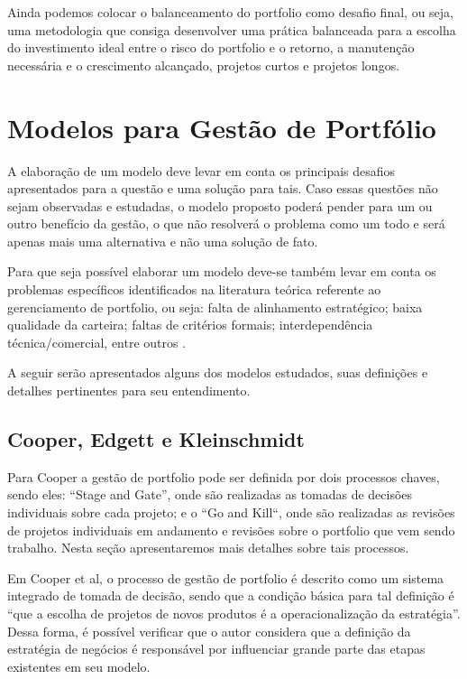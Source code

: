 \documentclass[12pt,a4paper,ruledheader,tocpage=prefix,floatnumber=continuous,pagestart=folhaderosto,font=times]{abnt}
\begin{document}
Ainda podemos colocar o balanceamento do portfolio como desafio final, ou seja, uma metodologia que consiga 
desenvolver uma prática balanceada para a escolha do investimento ideal entre o risco do portfolio e o retorno, a manutenção necessária e o crescimento 
alcançado, projetos curtos e projetos longos.\cite{cooper}

\chapter{Modelos para Gestão de Portfólio} 
A elaboração de um modelo deve levar em conta os principais desafios apresentados para a questão e uma solução para tais. Caso essas questões não sejam 
observadas e estudadas, o modelo proposto poderá pender para um ou outro benefício da gestão, o que não resolverá o problema como um todo e será apenas 
mais  uma alternativa e não uma solução de fato. 

Para que seja possível elaborar um modelo deve-se também levar em conta os problemas específicos identificados na literatura teórica referente ao
gerenciamento de portfolio, ou seja: falta de alinhamento estratégico; baixa qualidade da carteira; faltas de critérios formais; interdependência 
técnica/comercial, entre outros \cite{martino1, martino2, cooper}.

A seguir serão apresentados alguns dos modelos estudados, suas definições e detalhes pertinentes para seu entendimento.

\section{Cooper, Edgett e Kleinschmidt}
Para Cooper a gestão de portfolio pode ser definida por dois processos chaves, sendo eles: ``Stage and Gate'', onde são realizadas as tomadas de 
decisões individuais sobre cada projeto; e o ``Go and Kill``, onde são realizadas as revisões de projetos individuais em andamento e revisões 
sobre o portfolio que vem sendo trabalho. Nesta seção apresentaremos mais detalhes sobre tais processos.

Em Cooper et al, o processo de gestão de portfolio é descrito como um sistema integrado de tomada de decisão, sendo que a condição básica para tal definição
é ``que a escolha de projetos de novos produtos é a operacionalização da estratégia''. Dessa forma, é possível verificar que o autor considera que a definição
da estratégia de negócios é responsável por influenciar grande parte das etapas existentes em seu modelo.
\end{document}
